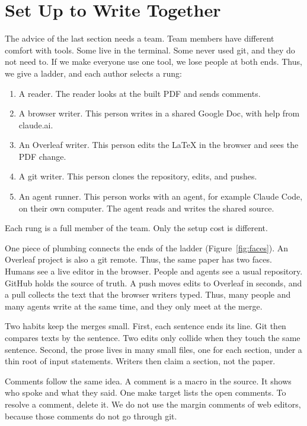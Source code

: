 \section{Set Up to Write Together}

The advice of the last section needs a team.
Team members have different comfort with tools.
Some live in the terminal.
Some never used git, and they do not need to.
If we make everyone use one tool, we lose people at both ends.
Thus, we give a ladder, and each author selects a rung:
\begin{enumerate}
\item A reader.
The reader looks at the built PDF and sends comments.
\item A browser writer.
This person writes in a shared Google Doc, with help from claude.ai.
\item An Overleaf writer.
This person edits the LaTeX in the browser and sees the PDF change.
\item A git writer.
This person clones the repository, edits, and pushes.
\item An agent runner.
This person works with an agent, for example Claude Code, on their own
computer.
The agent reads and writes the shared source.
\end{enumerate}
Each rung is a full member of the team.
Only the setup cost is different.

One piece of plumbing connects the ends of the ladder
(Figure~\ref{fig:faces}).
An Overleaf project is also a git remote.
Thus, the same paper has two faces.
Humans see a live editor in the browser.
People and agents see a usual repository.
GitHub holds the source of truth.
A push moves edits to Overleaf in seconds, and a pull collects the
text that the browser writers typed.
Thus, many people and many agents write at the same time, and they
only meet at the merge.

Two habits keep the merges small.
First, each sentence ends its line.
Git then compares texts by the sentence.
Two edits only collide when they touch the same sentence.
Second, the prose lives in many small files, one for each section,
under a thin root of input statements.
Writers then claim a section, not the paper.

Comments follow the same idea.
A comment is a macro in the source.
It shows who spoke and what they said.
One make target lists the open comments.
To resolve a comment, delete it.
We do not use the margin comments of web editors, because those
comments do not go through git.

